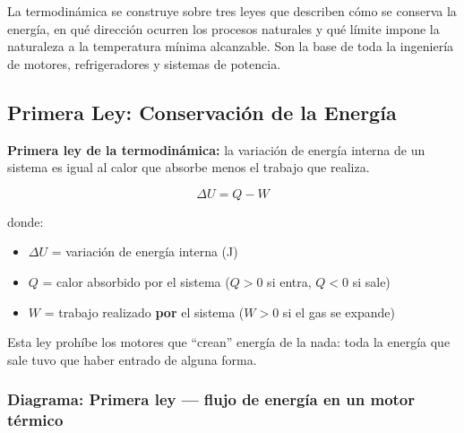 \begin{seccion}
La termodinámica se construye sobre tres leyes que describen cómo se conserva la energía, en qué dirección ocurren los procesos naturales y qué límite impone la naturaleza a la temperatura mínima alcanzable. Son la base de toda la ingeniería de motores, refrigeradores y sistemas de potencia.
\end{seccion}

\subsection{Primera Ley: Conservación de la Energía}

\begin{seccion}
\begin{definicion}
\textbf{Primera ley de la termodinámica:} la variación de energía interna de un sistema es igual al calor que absorbe menos el trabajo que realiza.
\end{definicion}

\begin{ecuacion}
$$\Delta U = Q - W$$

donde:
\begin{itemize}
    \item $\Delta U$ = variación de energía interna (J)
    \item $Q$ = calor absorbido por el sistema ($Q > 0$ si entra, $Q < 0$ si sale)
    \item $W$ = trabajo realizado \textbf{por} el sistema ($W > 0$ si el gas se expande)
\end{itemize}
\end{ecuacion}

Esta ley prohíbe los motores que ``crean'' energía de la nada: toda la energía que sale tuvo que haber entrado de alguna forma.
\end{seccion}

\subsubsection{Diagrama: Primera ley --- flujo de energía en un motor térmico}

